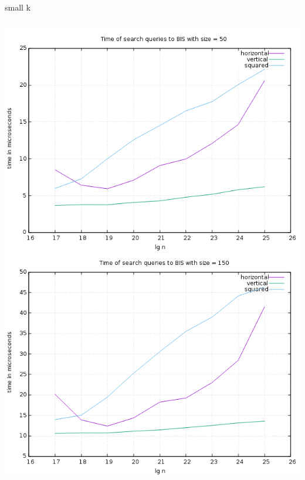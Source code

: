 \documentclass[pdf]{beamer}
\begin{document}
\begin{frame}{small k}
  \begin{columns}
    \includegraphics[scale=0.32]{pictures/analysis/smalls/all_50.png}
    \includegraphics[scale=0.32]{pictures/analysis/smalls/all_150.png}
  \end{columns}
\end{frame}
\end{document}
